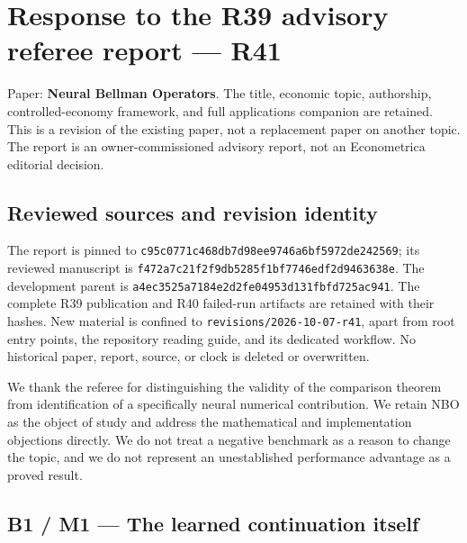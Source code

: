 \documentclass[
  11pt,
]{article}
\author{}
\date{}
\begin{document}
\hypertarget{response-to-the-r39-advisory-referee-report-r41}{%
\section{Response to the R39 advisory referee report ---
R41}\label{response-to-the-r39-advisory-referee-report-r41}}

Paper: \textbf{Neural Bellman Operators}. The title, economic topic,
authorship, controlled-economy framework, and full applications
companion are retained. This is a revision of the existing paper, not a
replacement paper on another topic. The report is an owner-commissioned
advisory report, not an Econometrica editorial decision.

\hypertarget{reviewed-sources-and-revision-identity}{%
\subsection{Reviewed sources and revision
identity}\label{reviewed-sources-and-revision-identity}}

The report is pinned to
\texttt{c95c0771}\allowbreak\texttt{c468db7d}\allowbreak\texttt{98ee9746}\allowbreak\texttt{a6bf5972}\allowbreak\texttt{de242569}; its reviewed
manuscript is \texttt{f472a7c2}\allowbreak\texttt{1f2f9db5}\allowbreak\texttt{285f1bf7}\allowbreak\texttt{746edf2d}\allowbreak\texttt{9463638e}. The
development parent is \texttt{a4ec3525}\allowbreak\texttt{a7184e2d}\allowbreak\texttt{2fe04953}\allowbreak\texttt{d131fbfd}\allowbreak\texttt{725ac941}.
The complete R39 publication and R40 failed-run artifacts are retained
with their hashes. New material is confined to
\texttt{revisions/2026-10-07-r41}, apart from root entry points, the
repository reading guide, and its dedicated workflow. No historical
paper, report, source, or clock is deleted or overwritten.

We thank the referee for distinguishing the validity of the comparison
theorem from identification of a specifically neural numerical
contribution. We retain NBO as the object of study and address the
mathematical and implementation objections directly. We do not treat a
negative benchmark as a reason to change the topic, and we do not
represent an unestablished performance advantage as a proved result.

\hypertarget{b1-m1-the-learned-continuation-itself}{%
\subsection{B1 / M1 --- The learned continuation
itself}\label{b1-m1-the-learned-continuation-itself}}
\end{document}
